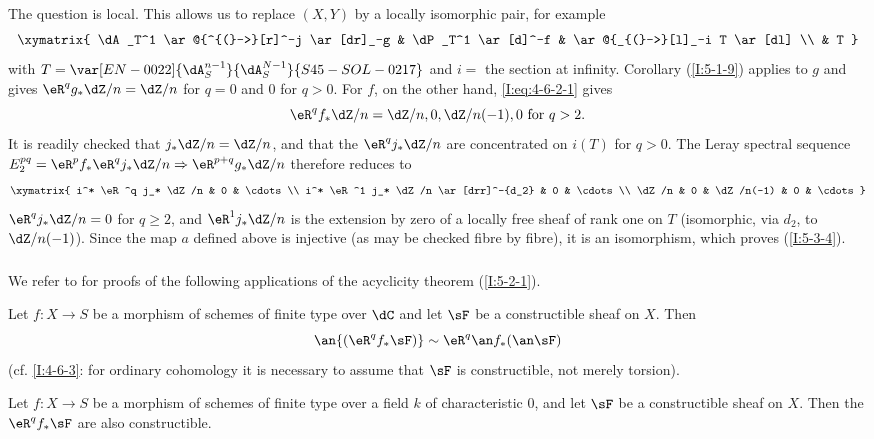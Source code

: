 The question is local. This allows us to replace $(X,Y)$ by a locally
isomorphic pair, for example
\[\xymatrix{
  \dA_T^1 \ar@{^{(}->}[r]^-j \ar[dr]_-g
    & \dP_T^1 \ar[d]^-f
    & \ar@{_{(}->}[l]_-i T \ar[dl] \\
  & T
}\]
with $T=\var[EN-0022]{\dA_S^{n-1}}{\dA_S^{N-1}}{S45-SOL-0217}$ and $i=$ the section at infinity. Corollary
(\ref{I:5-1-9}) applies to $g$ and gives
$\eR^qg_*\dZ/n=\dZ/n$ for $q=0$ and $0$ for $q>0$. For $f$, on the
other hand, \eqref{I:eq:4-6-2-1} gives
\[
  \eR^q f_* \dZ/n = \dZ/n,0,\dZ/n(-1),0 \text{ for $q>2$.}
\]
It is readily checked that $j_*\dZ/n=\dZ/n$, and that the
$\eR^qj_*\dZ/n$ are concentrated on $i(T)$ for $q>0$. The Leray
spectral sequence
$E_2^{pq}=\eR^pf_*\eR^qj_*\dZ/n\Rightarrow\eR^{p+q}g_*\dZ/n$ therefore
reduces to
\[\xymatrix{
  i^* \eR^q j_* \dZ/n & 0 & \cdots \\
  i^* \eR^1 j_* \dZ/n \ar[drr]^-{d_2} & 0 & \cdots \\
  \dZ/n              & 0 & \dZ/n(-1) & 0 & \cdots
}\]
$\eR^qj_*\dZ/n=0$ for $q\geqslant2$, and $\eR^1j_*\dZ/n$ is the
extension by zero of a locally free sheaf of rank one on $T$ (isomorphic,
via $d_2$, to $\dZ/n(-1)$). Since the map $a$ defined above is injective
(as may be checked fibre by fibre), it is an isomorphism, which proves
(\ref{I:5-3-4}).

\subsubsection{}\label{I:5-3-5}

We refer to  for proofs of the following applications
of the acyclicity theorem (\ref{I:5-2-1}).

\begin{theorem}\label{I:5-3-6} %
Let $f:X\to S$ be a morphism of schemes of finite type over $\dC$ and
let $\sF$ be a constructible sheaf on $X$. Then
\[
  \an{(\eR^q f_*\sF)} \sim \eR^q \an f_* (\an\sF)
\]
(cf. \ref{I:4-6-3}: for ordinary cohomology it is necessary to assume
that $\sF$ is constructible, not merely torsion).
\end{theorem}

\begin{theorem}\label{I:5-3-7} %
Let $f:X\to S$ be a morphism of schemes of finite type over a field $k$
of characteristic $0$, and let $\sF$ be a constructible sheaf on $X$.
Then the $\eR^qf_*\sF$ are also constructible.
\end{theorem}

